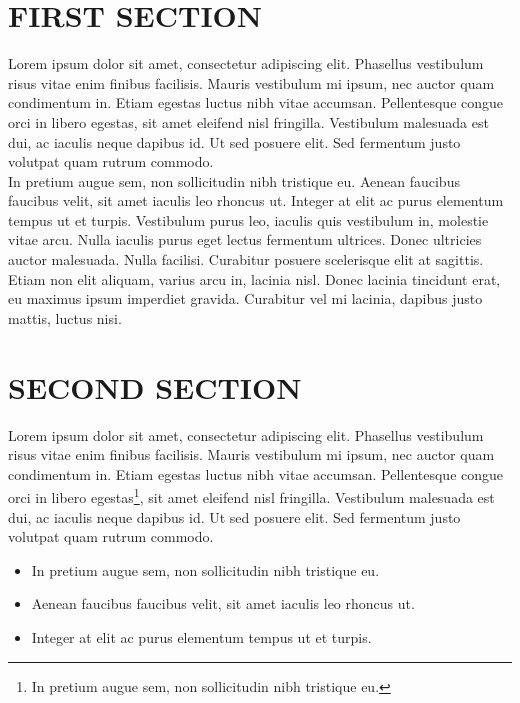 \documentclass[a4paper,margin=1in]{article}
\begin{document}



\tableofcontents
\pagebreak


\section{FIRST SECTION}
Lorem ipsum dolor sit amet, consectetur adipiscing elit. Phasellus vestibulum risus vitae enim finibus facilisis. Mauris vestibulum mi ipsum, nec auctor quam condimentum in. Etiam egestas luctus nibh vitae accumsan. Pellentesque congue orci in libero egestas, sit amet eleifend nisl fringilla. Vestibulum malesuada est dui, ac iaculis neque dapibus id. Ut sed posuere elit. Sed fermentum justo volutpat quam rutrum commodo.\\

In pretium augue sem, non sollicitudin nibh tristique eu. Aenean faucibus faucibus velit, sit amet iaculis leo rhoncus ut. Integer at elit ac purus elementum tempus ut et turpis. Vestibulum purus leo, iaculis quis vestibulum in, molestie vitae arcu. Nulla iaculis purus eget lectus fermentum ultrices. Donec ultricies auctor malesuada. Nulla facilisi. Curabitur posuere scelerisque elit at sagittis. Etiam non elit aliquam, varius arcu in, lacinia nisl. Donec lacinia tincidunt erat, eu maximus ipsum imperdiet gravida. Curabitur vel mi lacinia, dapibus justo mattis, luctus nisi.\\

\section{SECOND SECTION}
Lorem ipsum dolor sit amet, consectetur adipiscing elit. Phasellus vestibulum risus vitae enim finibus facilisis. Mauris vestibulum mi ipsum, nec auctor quam condimentum in. Etiam egestas luctus nibh vitae accumsan. Pellentesque congue orci in libero egestas\footnote{In pretium augue sem, non sollicitudin nibh tristique eu.}, sit amet eleifend nisl fringilla. Vestibulum malesuada est dui, ac iaculis neque dapibus id. Ut sed posuere elit. Sed fermentum justo volutpat quam rutrum commodo.\\
\begin{itemize}
  \item In pretium augue sem, non sollicitudin nibh tristique eu.
  \item Aenean faucibus faucibus velit, sit amet iaculis leo rhoncus ut.
  \item Integer at elit ac purus elementum tempus ut et turpis.
\end{itemize}
\end{document}
